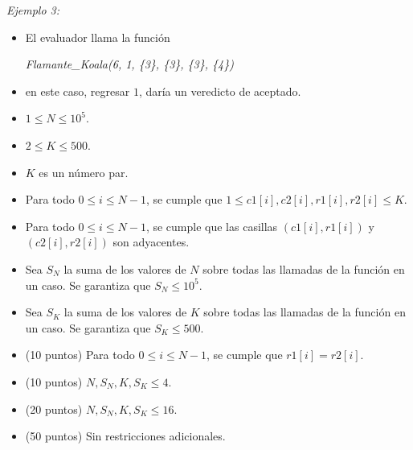 \documentclass[12pt]{scrartcl}
\begin{document}
        {\itshape Ejemplo 3:}
        \begin{itemize}
            \item El evaluador llama la función 

            \begin{center}
                {\itshape Flamante\_Koala(6, 1, \{3\}, \{3\}, \{3\}, \{4\})}
            \end{center}
            
            \item en este caso, regresar $1$, daría un veredicto de aceptado. 
        \end{itemize}
        
        \begin{itemize}
            \item $1 \le N \le 10^5$.
            \item $2 \le K \le 500$. 
            \item $K$ es un número par.
            \item Para todo $0 \le i \le N - 1$, se cumple que $1 \le c1[i], c2[i], r1[i], r2[i] \le K$.
            \item Para todo $0 \le i \le N - 1$, se cumple que las casillas $(c1[i], r1[i])$ y $(c2[i], r2[i])$ son adyacentes.
            \item Sea $S_N$ la suma de los valores de $N$ sobre todas las llamadas de la función en un caso. Se garantiza que $S_N \le 10^5$.
            \item Sea $S_K$ la suma de los valores de $K$ sobre todas las llamadas de la función en un caso. Se garantiza que $S_K \le 500$.
        \end{itemize}
    


    \begin{itemize}
        \item (10 puntos) Para todo $0 \le i \le N - 1$, se cumple que $r1[i] = r2[i]$.
        \item (10 puntos) $N, S_N, K, S_K \le 4$.
        \item (20 puntos) $N, S_N, K, S_K \le 16$.
        \item (50 puntos) Sin restricciones adicionales.
    \end{itemize}
\end{document}
